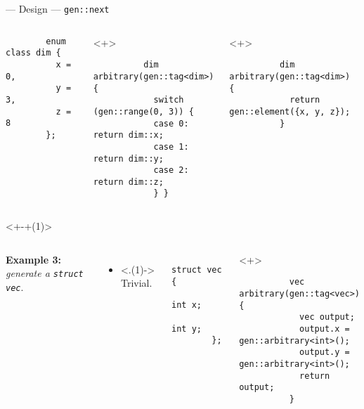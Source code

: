 \begin{frame}[fragile,t]{\halcheck{} --- Design --- \texttt{gen::next}}
\begin{onlyenv}
\begin{columns}[T]
      \begin{verbatim}
        enum class dim {
          x = 0,
          y = 3,
          z = 8
        };
      \end{verbatim}

      \begin{onlyenv}<+>
        \begin{verbatim}
          dim arbitrary(gen::tag<dim>) {
            switch (gen::range(0, 3)) {
            case 0: return dim::x;
            case 1: return dim::y;
            case 2: return dim::z;
            } }
        \end{verbatim}
      \end{onlyenv}

      \begin{onlyenv}<+>
        \begin{verbatim}
          dim arbitrary(gen::tag<dim>) {
            return gen::element({x, y, z});
          }
        \end{verbatim}
      \end{onlyenv}
    \end{columns}
  \end{onlyenv}

  \begin{onlyenv}<+-+(1)>
    \begin{columns}[T]
      \textbf{Example 3:} \emph{generate a \texttt{struct vec}}.

      \begin{itemize}
        \item<.(1)-> Trivial.
      \end{itemize}

      \begin{verbatim}
        struct vec {
          int x;
          int y;
        };
      \end{verbatim}

      \begin{onlyenv}<+>
        \begin{verbatim}
          vec arbitrary(gen::tag<vec>) {
            vec output;
            output.x = gen::arbitrary<int>();
            output.y = gen::arbitrary<int>();
            return output;
          }
        \end{verbatim}
      \end{onlyenv}
    \end{columns}
  \end{onlyenv}


\end{frame}
